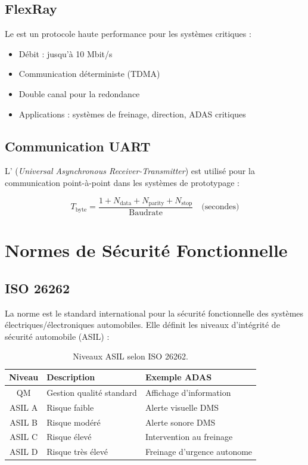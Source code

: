 \subsection{FlexRay}

Le  \cite{flexray2010} est un protocole haute performance pour les systèmes critiques :

\begin{itemize}
    \item Débit : jusqu'à 10 Mbit/s
    \item Communication déterministe (TDMA)
    \item Double canal pour la redondance
    \item Applications : systèmes de freinage, direction, ADAS critiques
\end{itemize}

\subsection{Communication UART}

L' (\textit{Universal Asynchronous Receiver-Transmitter}) est utilisé pour la communication point-à-point dans les systèmes de prototypage :

\begin{equation}
T_{\text{byte}} = \frac{1 + N_{\text{data}} + N_{\text{parity}} + N_{\text{stop}}}{\text{Baudrate}} \quad \text{(secondes)}
\label{eq:uart_timing}
\end{equation}

\section{Normes de Sécurité Fonctionnelle}

\subsection{ISO 26262}

La norme  \cite{iso26262} est le standard international pour la sécurité fonctionnelle des systèmes électriques/électroniques automobiles. Elle définit les niveaux d'intégrité de sécurité automobile (ASIL) :

\begin{table}[H]
\centering
\caption{Niveaux ASIL selon ISO 26262.}
\label{tab:asil}
\renewcommand{\arraystretch}{1.3}
\begin{tabular}{|c|l|l|}
\hline
\rowcolor{stellantisblue!15}
\textbf{Niveau} & \textbf{Description} & \textbf{Exemple ADAS} \\
\hline
QM & Gestion qualité standard & Affichage d'information \\
\hline
ASIL A & Risque faible & Alerte visuelle DMS \\
\hline
ASIL B & Risque modéré & Alerte sonore DMS \\
\hline
ASIL C & Risque élevé & Intervention au freinage \\
\hline
ASIL D & Risque très élevé & Freinage d'urgence autonome \\
\hline
\end{tabular}
\end{table}


